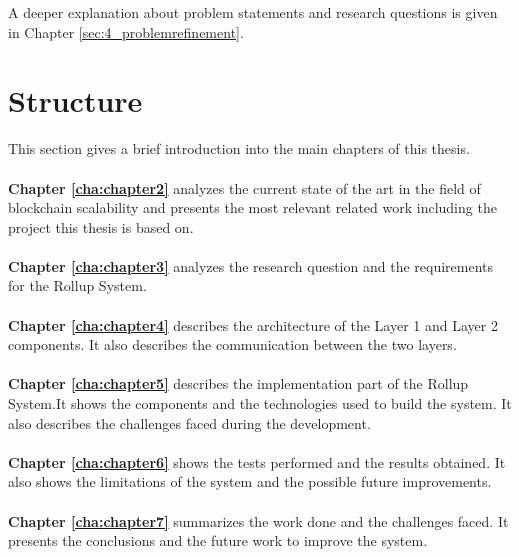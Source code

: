A deeper explanation about problem statements and research questions is given in Chapter \ref{sec:4_problemrefinement}.

\section{Structure\label{sec:structure}}


This section gives a brief introduction into the main chapters of this thesis.
\\
\\
\textbf{Chapter \ref{cha:chapter2}} analyzes the current state of the art in the field of blockchain scalability and presents the most relevant related work including the project this thesis is based on.
\\
\\
\textbf{Chapter \ref{cha:chapter3}} analyzes the research question and the requirements for the Rollup System.
\\
\\
\textbf{Chapter \ref{cha:chapter4}} describes the architecture of the Layer 1 and Layer 2 components. It also describes the communication between the two layers.
\\
\\
\textbf{Chapter \ref{cha:chapter5}} describes the implementation part of the Rollup System.It shows the components and the technologies used to build the system. It also describes the challenges faced during the development.
\\
\\
\textbf{Chapter \ref{cha:chapter6}} shows the tests performed and the results obtained. It also shows the limitations of the system and the possible future improvements.
\\
\\
\textbf{Chapter \ref{cha:chapter7}} summarizes the work done and the challenges faced. It presents the conclusions and the future work to improve the system.
